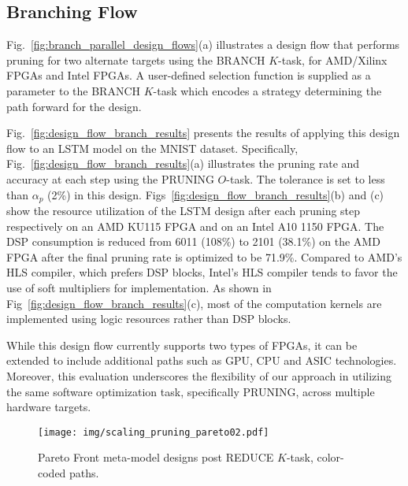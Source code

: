 \subsection{Branching Flow}\label{sec:branch}

Fig.~\ref{fig:branch_parallel_design_flows}(a) illustrates a design flow that performs pruning for two alternate targets using the BRANCH $K$-task, for AMD/Xilinx FPGAs and Intel FPGAs. A user-defined selection function is supplied as a parameter to the BRANCH $K$-task which encodes a strategy determining the path forward for the design. 

Fig.~\ref{fig:design_flow_branch_results} presents the results of applying this design flow to an LSTM model on the MNIST dataset. Specifically, Fig.~\ref{fig:design_flow_branch_results}(a) illustrates the pruning rate and accuracy at each step using the PRUNING $O$-task. The tolerance is set to less than $\alpha_{p}$ (2\%) in this design.  Figs~\ref{fig:design_flow_branch_results}(b) and (c) show the resource utilization of the LSTM design after each pruning step respectively on an AMD KU115 FPGA and on an Intel A10 1150 FPGA. The DSP consumption is reduced from 6011 (108\%) to 2101 (38.1\%) on the AMD FPGA after the final pruning rate is optimized to be 71.9\%. Compared to AMD's HLS compiler, which prefers DSP blocks, Intel's HLS compiler tends to favor the use of soft multipliers for implementation. As shown in Fig~\ref{fig:design_flow_branch_results}(c), most of the computation kernels are implemented using logic resources rather than DSP blocks. 

While this design flow currently supports two types of FPGAs, it can be extended to include additional paths such as GPU, CPU and ASIC technologies. Moreover, this evaluation underscores the flexibility of our approach in utilizing the same software optimization task, specifically PRUNING, across multiple hardware targets.

\begin{figure}
\begin{center}
\texttt{[image: img/scaling\_pruning\_pareto02.pdf]}
\end{center}
\caption{Pareto Front meta-model designs post REDUCE $K$-task, color-coded paths.}

\label{fig:parallel_results}

\end{figure}


